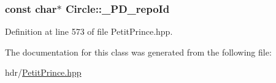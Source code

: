 \subsubsection[{\texorpdfstring{\+\_\+\+P\+D\+\_\+repo\+Id}{_PD_repoId}}]{ const char$\ast$ Circle\+::\+\_\+\+P\+D\+\_\+repo\+Id\hspace{0.3cm}{\ttfamily [static]}}\hypertarget{class_circle_a3cc85c810268073e3c3f0519aa3b12a0}{}\label{class_circle_a3cc85c810268073e3c3f0519aa3b12a0}


Definition at line 573 of file Petit\+Prince.\+hpp.



The documentation for this class was generated from the following file\+:\begin{DoxyCompactItemize}
\item 
hdr/\hyperlink{_petit_prince_8hpp}{Petit\+Prince.\+hpp}\end{DoxyCompactItemize}
